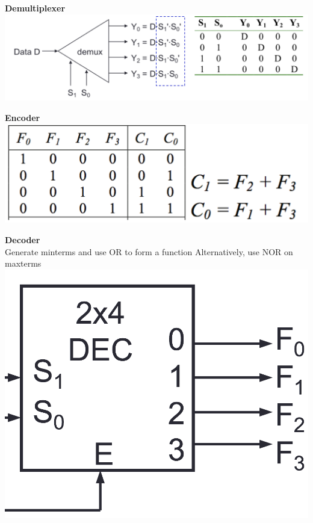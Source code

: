 \documentclass[a4paper]{article} \usepackage[backend=biber, style=numeric, sorting=none]{biblatex}
\begin{document}
\begin{multicols*}{4}
\begin{multicols*}{2}
\textbf{{Demultiplexer}}
\vfill\null
\columnbreak
{\centering \includegraphics[scale=0.16]{demultiplexer}}
\end{multicols*}

\begin{multicols*}{2}
\textbf{{Encoder}}
\vfill\null
\columnbreak
{\centering \includegraphics[scale=0.18]{encoder}}
\end{multicols*}

\begin{multicols*}{2}
\textbf{{Decoder}}
\\ Generate minterms and use OR to form a function
Alternatively, use NOR on maxterms
\vfill\null
\columnbreak
{\centering \includegraphics[scale=0.13]{decoder}}
\end{multicols*}


\end{multicols*}
\end{document}
